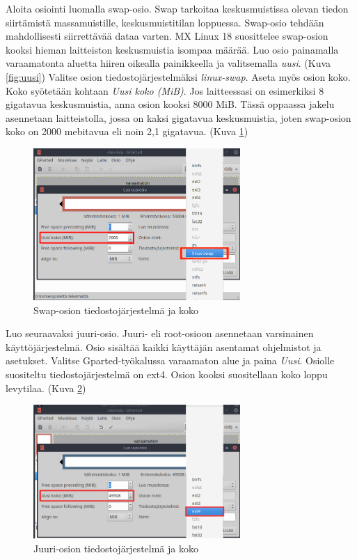 \documentclass[a4paper, 12pt, finnish]{article}
\begin{document}
Aloita osiointi luomalla swap-osio. Swap tarkoitaa keskusmuistissa olevan tiedon siirtämistä massamuistille, keskusmuistitilan loppuessa.
Swap-osio tehdään mahdollisesti siirrettävää dataa varten. MX Linux 18 suosittelee swap-osion kooksi hieman laitteiston keskusmuistia isompaa määrää. Luo osio painamalla varaamatonta aluetta hiiren oikealla painikkeella ja valitsemalla \textit{uusi}. (Kuva \ref{fig:uusi})
Valitse osion tiedostojärjestelmäksi \textit{linux-swap}.
Aseta myös osion koko. Koko syötetään kohtaan \textit{Uusi koko (MiB)}. Jos laitteessasi on esimerkiksi 8 gigatavua keskusmuistia, anna osion kooksi 8000 MiB. Tässä oppaassa jakelu asennetaan laitteistolla, jossa on kaksi gigatavua keskusmuistia, joten swap-osion koko on 2000 mebitavua eli noin 2,1 gigatavua. (Kuva \ref{fig:swap})
\clearpage
\begin{figure}[htpb]
    \begin{center}
        \includegraphics[width=0.7\textwidth]{asen/osiointi_gparted_swap}
        \caption{Swap-osion tiedostojärjestelmä ja koko}
        \label{fig:swap}
    \end{center}
\end{figure}


Luo seuraavaksi juuri-osio. Juuri- eli root-osioon asennetaan varsinainen käyttöjärjestelmä. Osio sisältää kaikki käyttäjän asentamat ohjelmistot ja asetukset. Valitse Gparted-työkalussa varaamaton alue ja paina \textit{Uusi}. Osiolle suositeltu tiedostojärjestelmä on ext4. Osion kooksi suositellaan koko loppu levytilaa. (Kuva \ref{fig:root})

\begin{figure}[htpb]
    \begin{center}
        \includegraphics[width=0.7\textwidth]{asen/osiointi_gparted_root}
        \caption{Juuri-osion tiedostojärjestelmä ja koko}
        \label{fig:root}
    \end{center}
\end{figure}
\end{document}

